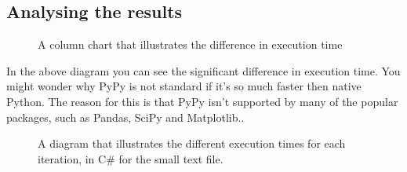 \subsection{Analysing the results}



\begin{figure}[H]
    \vspace*{-0.8cm}
    \caption{A column chart that illustrates the difference in execution time}
\end{figure}

In the above diagram you can see the significant difference in execution time. You might wonder why PyPy is not standard if it's so much faster then native Python. The reason for this is that PyPy isn't supported by many of the popular packages, such as Pandas, SciPy and Matplotlib.\cite{quora_pypy}.

\begin{figure}[H]
    \vspace*{-0.8cm}
    \caption{A diagram that illustrates the different execution times for each iteration, in C\# for the small text file.}
\end{figure}

